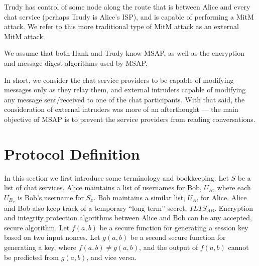 \documentclass[twoside,10pt]{article}
\begin{document}
\begin{multicols}{2}
Trudy has control of some node along the route that is between Alice and every chat service (perhaps Trudy is Alice's ISP), and is capable of performing a MitM attack.  We refer to this more traditional type of MitM attack as an external MitM attack.

We assume that both Hank and Trudy know MSAP, as well as the encryption and message digest algorithms used by MSAP.

In short, we consider the chat service providers to be capable of modifying messages only as they relay them, and external intruders capable of modifying any message sent/received to one of the chat participants.  With that said, the consideration of external intruders was more of an afterthought --- the main objective of MSAP is to prevent the service providers from reading conversations.

\section{Protocol Definition}\label{sec:protoDef}
In this section we first introduce some terminology and bookkeeping.  Let $S$ be a list of chat services.  Alice maintains a list of usernames for Bob, $U_{B}$, where each $U_{B_x}$ is Bob's username for $S_x$.  Bob maintains a similar list, $U_{A}$, for Alice.  Alice and Bob also keep track of a temporary ``long term'' secret, $TLTS_{AB}$.  Encryption and integrity protection algorithms between Alice and Bob can be any accepted, secure algorithm.  Let $f(a,b)$ be a secure function for generating a session key based on two input nonces.  Let $g(a,b)$ be a second secure function for generating a key, where $f(a,b) \neq g(a,b)$, and the output of $f(a,b)$ cannot be predicted from $g(a,b)$, and vice versa.


\end{multicols}
\end{document}
